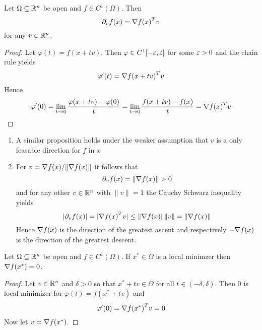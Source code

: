 \begin{lemma}\label{lemma:directional_derivative}
    Let \( \Omega \subseteq \mathbb{R}^n \) be open and \( f \in C^1(\Omega) \). Then
    \[
        \partial_v f(x) = \nabla{f(x)}^T v
    \]
    for any \( v \in \mathbb{R}^n \).
\end{lemma}

\begin{proof}
    Let \( \varphi(t) = f(x + tv) \). Then \( \varphi \in C^1[-\varepsilon, \varepsilon ] \) for some \( \varepsilon > 0 \)
    and the chain rule yields
    \[
        \varphi'(t) = {\nabla f(x + tv)}^T v
    \]
    Hence
    \[
        \varphi'(0) = \lim_{t \to 0} \frac{\varphi(x + tv) - \varphi(0)}{t} =
        \lim_{t \to 0} \frac{f(x + tv) - f(x)}{t} = {\nabla f(x)}^T v
    \]
\end{proof}
\bigskip


\begin{remarks}\hfill
    \begin{enumerate}
        \item A similar proposition holds under the weaker assumption that \( v \) is a only feasable direction
              for \( f \) in \( x \)
        \item For \( v = \nabla{f(x)}/\| \nabla{f(x)}\| \) it follows that
              \[
                  \partial_v f (x) = \|\nabla{f(x)}\| > 0
              \]
              and for any other \( v \in \mathbb{R}^n \) with \( \|v\| = 1 \) the Cauchy Schwarz inequality yields
              \[
                  \left|\partial_v f(x)\right| = |\nabla{f(x)}^T v|
                  \le \|\nabla{f(x)}\| \|v\| =\|\nabla{f(x)}\|
              \]
              Hence \( \nabla{f(x)} \) is the direction of the greatest ascent and respectively
              \( -\nabla{f(x)} \) is the direction of the greatest descent.
    \end{enumerate}
\end{remarks}
\bigskip


\begin{theorem}\label{thm:fonc}
    Let \( \Omega \subseteq \mathbb{R}^n \) be open and \( f \in C^1(\Omega) \). If \( x^* \in \Omega \) is a local minimzer then
    \( \nabla f(x^*) = 0 \).
\end{theorem}

\begin{proof}
    Let \( v \in \mathbb{R}^n \) and \( \delta > 0 \) so that \( x^* + tv \in \Omega \) for all \( t \in (-\delta, \delta) \).
    Then \( 0 \) is local minimizer for \( \varphi(t) = f(x^* + tv) \) and
    \[
        \varphi'(0) = {\nabla f(x^*)}^T v = 0
    \]
    Now let \( v = \nabla f(x^*) \).
\end{proof}
\bigskip


